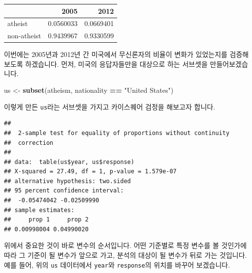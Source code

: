 \documentclass[]{book}
\newenvironment{Shaded}{\begin{snugshade}}{\end{snugshade}}
\newcommand{\CommentTok}[1]{\textcolor[rgb]{0.56,0.35,0.01}{\textit{#1}}}
\newcommand{\DataTypeTok}[1]{\textcolor[rgb]{0.13,0.29,0.53}{#1}}
\newcommand{\DecValTok}[1]{\textcolor[rgb]{0.00,0.00,0.81}{#1}}
\newcommand{\KeywordTok}[1]{\textcolor[rgb]{0.13,0.29,0.53}{\textbf{#1}}}
\newcommand{\NormalTok}[1]{#1}
\newcommand{\OperatorTok}[1]{\textcolor[rgb]{0.81,0.36,0.00}{\textbf{#1}}}
\newcommand{\OtherTok}[1]{\textcolor[rgb]{0.56,0.35,0.01}{#1}}
\newcommand{\StringTok}[1]{\textcolor[rgb]{0.31,0.60,0.02}{#1}}
\begin{document}
\begin{Shaded}
\end{Shaded}

\begin{tabular}{l|r|r}
\hline
  & 2005 & 2012\\
\hline
atheist & 0.0560033 & 0.0669401\\
\hline
non-atheist & 0.9439967 & 0.9330599\\
\hline
\end{tabular}

이번에는 2005년과 2012년 간 미국에서 무신론자의 비율이 변화가 있었는지를 검증해보도록 하겠습니다. 먼저, 미국의 응답자들만을 대상으로 하는 서브셋을 만들어보겠습니다.

\begin{Shaded}
\begin{Highlighting}[]
\NormalTok{us <-}\StringTok{ }\KeywordTok{subset}\NormalTok{(atheism, nationality }\OperatorTok{==}\StringTok{ "United States"}\NormalTok{)}
\end{Highlighting}
\end{Shaded}

이렇게 만든 \texttt{us}라는 서브셋을 가지고 카이스퀘어 검정을 해보고자 합니다.

\begin{Shaded}
\end{Shaded}

\begin{verbatim}
## 
##  2-sample test for equality of proportions without continuity
##  correction
## 
## data:  table(us$year, us$response)
## X-squared = 27.49, df = 1, p-value = 1.579e-07
## alternative hypothesis: two.sided
## 95 percent confidence interval:
##  -0.05474042 -0.02509990
## sample estimates:
##     prop 1     prop 2 
## 0.00998004 0.04990020
\end{verbatim}

위에서 중요한 것이 바로 변수의 순서입니다. 어떤 기준별로 특정 변수를 볼 것인가에 따라 그 기준이 될 변수가 앞으로 가고, 분석의 대상이 될 변수가 뒤로 가는 것입니다. 예를 들어, 위의 \texttt{us} 데이터에서 \texttt{year}와 \texttt{response}의 위치를 바꾸어 보겠습니다.
\end{document}
